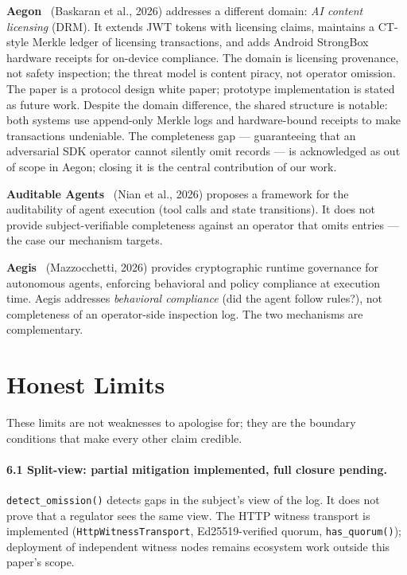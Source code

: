 \documentclass[11pt,a4paper]{article}
\newcommand{\code}[1]{\texttt{#1}}
\newcommand{\term}[1]{\emph{#1}}
\begin{document}
\textbf{Aegon}~\cite{aegon2026} (Baskaran et al., 2026) addresses a different domain:
\term{AI content licensing} (DRM). It extends JWT tokens with licensing claims, maintains
a CT-style Merkle ledger of licensing transactions, and adds Android StrongBox hardware
receipts for on-device compliance. The domain is licensing provenance, not safety
inspection; the threat model is content piracy, not operator omission. The paper is a
protocol design white paper; prototype implementation is stated as future work.
Despite the domain difference, the shared structure is notable: both systems use
append-only Merkle logs and hardware-bound receipts to make transactions undeniable.
The completeness gap --- guaranteeing that an adversarial SDK operator cannot silently
omit records --- is acknowledged as out of scope in Aegon; closing it is the central
contribution of our work.

\textbf{Auditable Agents}~\cite{auditableagents2026} (Nian et al., 2026) proposes a
framework for the auditability of agent execution (tool calls and state transitions). It
does not provide subject-verifiable completeness against an operator that omits entries ---
the case our mechanism targets.

\textbf{Aegis}~\cite{aegis2026} (Mazzocchetti, 2026) provides cryptographic runtime
governance for autonomous agents, enforcing behavioral and policy compliance at execution
time. Aegis addresses \term{behavioral compliance} (did the agent follow rules?), not
completeness of an operator-side inspection log. The two mechanisms are complementary.

\section{Honest Limits}
\label{sec:limits}

These limits are not weaknesses to apologise for; they are the boundary conditions that
make every other claim credible.

\paragraph{6.1 Split-view: partial mitigation implemented, full closure pending.}
\label{limit:splitview}
\code{detect\_omission()} detects gaps in the subject's view of the log. It does not
prove that a regulator sees the same view. The HTTP witness transport is implemented
(\code{HttpWitnessTransport}, Ed25519-verified quorum, \code{has\_quorum()}); deployment
of independent witness nodes remains ecosystem work outside this paper's scope.
\end{document}
